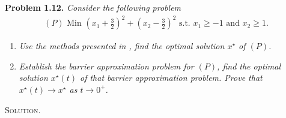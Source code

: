 \documentclass[a4paper]{article}
\numberwithin{equation}{section}
\begin{document}
\textbf{Problem 1.12.} \textit{Consider the following problem}
\begin{align}
\left( P \right) \mbox{ Min }{\left( {{x_1} + \frac{3}{2}} \right)^2} + {\left( {{x_2} - \frac{3}{2}} \right)^2} \mbox{ s.t. } {x_1} \ge  - 1 \mbox{ and } {x_2} \ge 1.
\end{align}
\begin{enumerate}
\item \textit{Use the methods presented in \cite{2}, find the optimal solution $x^\star$ of $\left(P\right)$.}
\item \textit{Establish the barrier approximation problem for $\left(P\right)$, find the optimal solution $x^\star \left(t\right)$ of that barrier approximation problem. Prove that $x^\star \left(t\right)\to x^\star$ as $t\to 0^+$.}
\end{enumerate}
\textsc{Solution.} 
\end{document}
